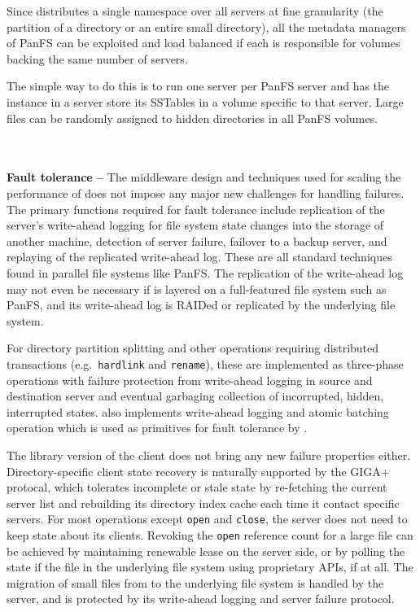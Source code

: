 Since \sys distributes a single namespace over all \sys servers at fine granularity
(the partition of a directory or an entire small directory),
all the metadata managers of PanFS can be exploited and load balanced
if each is responsible for volumes backing the same number of \sys servers.

The simple way to do this is to run one \sys server per PanFS server and
has the \ldb instance in a \sys server store its SSTables in a volume specific
to that \sys server. Large files can be randomly assigned to
hidden directories in all PanFS volumes.

~\\
~\\
\textbf{Fault tolerance -- }
The middleware design and techniques used for scaling the performance
of \sys does not impose any major new challenges for handling failures.
The primary functions required for fault tolerance include
replication of the \sys server's write-ahead logging for file system
state changes into the storage of another machine,
detection of server failure, failover to a backup server,
and replaying of the replicated write-ahead log.
These are all standard techniques found in parallel file systems like PanFS.
The replication of the write-ahead log may not even be necessary
if \sys is layered on a full-featured file system such as PanFS,
and its write-ahead log is RAIDed or replicated by the underlying file system.

For directory partition splitting and other operations requiring
distributed transactions (e.g.\texttt{ hardlink} and \texttt{rename}),
these are implemented as three-phase operations with failure protection
from write-ahead logging in source and destination server
and eventual garbaging collection of incorrupted, hidden, interrupted states.
\ldb also implements write-ahead logging and atomic batching operation
which is used as primitives for fault tolerance by \tfs.

The library version of the \sys client does not bring any new failure properties
either.
Directory-specific client state recovery is naturally supported by the GIGA+
protocal, which tolerates incomplete or stale state by
re-fetching the current server list and
rebuilding its directory index cache each time it contact specific servers.
For most operations except \texttt{open} and \texttt{close},
the \sys server does not need to keep state about its clients.
Revoking the \texttt{open} reference count for a large file can be achieved by
maintaining renewable lease on the server side,
or by polling the state if the file in the underlying file system
using proprietary APIs, if at all.
The migration of small files from \tfs to the underlying file system is
handled by the \sys server, and is protected by its write-ahead logging
and server failure protocol.
